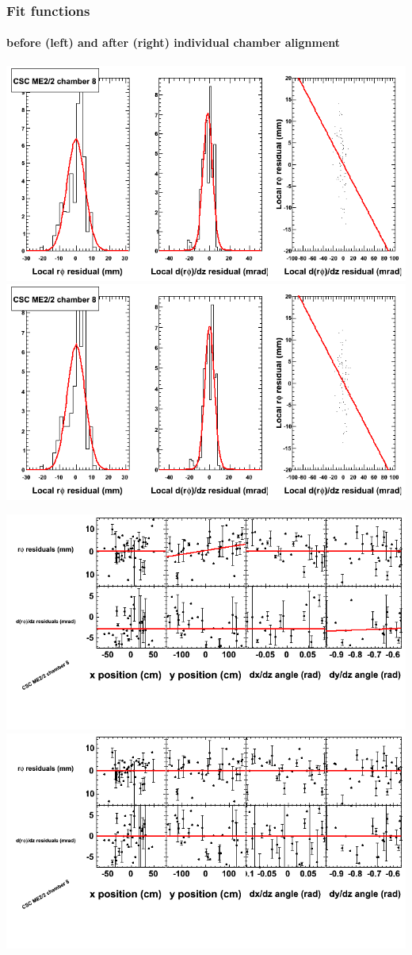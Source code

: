 \documentclass[compress]{beamer}
\begin{document}
\begin{frame}
\frametitle{Fit functions}
\framesubtitle{before (left) and after (right) individual chamber alignment}
\includegraphics[width=0.5\linewidth]{ringfits_3dof/beforefit_MEp22_08_bellcurve.png} \includegraphics[width=0.5\linewidth]{ringfits_3dof/afterfit_MEp22_08_bellcurve.png}

\includegraphics[width=0.5\linewidth]{ringfits_3dof/beforefit_MEp22_08_polynomials.png} \includegraphics[width=0.5\linewidth]{ringfits_3dof/afterfit_MEp22_08_polynomials.png}
\end{frame}
\end{document}

